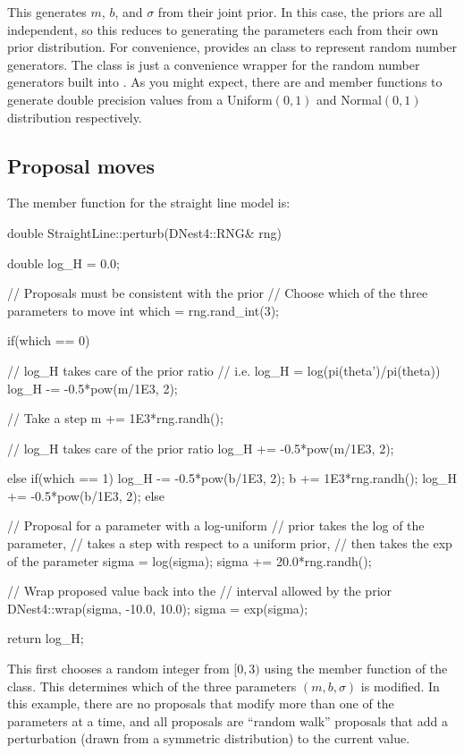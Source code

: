 \documentclass[article]{jss}
\begin{document}
This generates $m$, $b$, and $\sigma$ from their joint prior. In this case,
the priors are all independent, so this reduces to generating the parameters
each from their own prior distribution. For convenience,
 provides an  class to represent random number
generators. The  class is just a convenience wrapper for the
random number generators built into .
As you might expect, there are
 and  member functions to generate
double precision values
from a Uniform$(0,1)$ and Normal$(0,1)$ distribution respectively.

\subsection{Proposal moves}
The  member function for the straight line model is:
\begin{CodeChunk}
\begin{CodeInput}
double StraightLine::perturb(DNest4::RNG& rng)
{
    double log_H = 0.0;

    // Proposals must be consistent with the prior
    // Choose which of the three parameters to move
    int which = rng.rand_int(3);

    if(which == 0)
    {
        // log_H takes care of the prior ratio
        // i.e. log_H = log(pi(theta')/pi(theta))
        log_H -= -0.5*pow(m/1E3, 2);

        // Take a step
        m += 1E3*rng.randh();

        // log_H takes care of the prior ratio
        log_H += -0.5*pow(m/1E3, 2);
    }
    else if(which == 1)
    {
        log_H -= -0.5*pow(b/1E3, 2);
        b += 1E3*rng.randh();
        log_H += -0.5*pow(b/1E3, 2);
    }
    else
    {
        // Proposal for a parameter with a log-uniform
        // prior takes the log of the parameter,
        // takes a step with respect to a uniform prior,
        // then takes the exp of the parameter
        sigma = log(sigma);
        sigma += 20.0*rng.randh();

        // Wrap proposed value back into the
        // interval allowed by the prior
        DNest4::wrap(sigma, -10.0, 10.0);
        sigma = exp(sigma);
    }

    return log_H;
}
\end{CodeInput}
\end{CodeChunk}

This first chooses a random integer from $[0, 3)$ using the
 member function of the  class.
This determines which of the three parameters
$(m, b, \sigma)$ is modified. In this example, there are no proposals
that modify more than one of the parameters at a time, and all proposals
are ``random walk'' proposals that add a perturbation
(drawn from a symmetric distribution) to the current value.
\end{document}
